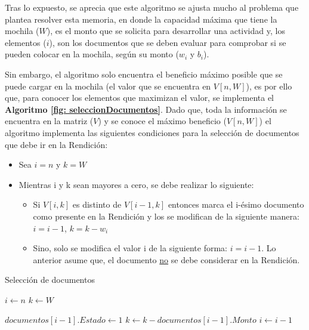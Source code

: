 Tras lo expuesto, se aprecia que este algoritmo se ajusta mucho al problema que plantea resolver esta memoria, en donde la capacidad máxima que tiene la mochila ($W$), es el monto que se solicita para desarrollar una actividad y, los elementos ($i$), son los documentos que se deben evaluar para comprobar si se pueden colocar en la mochila, según su monto ($w_i$ y $b_i$).

Sin embargo, el algoritmo solo encuentra el beneficio máximo posible que se puede cargar en la mochila (el valor que se encuentra en $V[n,W]$), es por ello que, para conocer los elementos  que maximizan el valor, se implementa el \textbf{Algoritmo \ref{fig: seleccionDocumentos}}. Dado que, toda la información se encuentra en la matriz ($V$) y se conoce el máximo beneficio ($V[n,W]$) el algoritmo implementa las siguientes condiciones para la selección de documentos que debe ir en la Rendición:


\begin{itemize}
    \item Sea $i=n$ y $k=W$
    \item Mientras i y k sean mayores a cero, se debe realizar lo siguiente:
    \begin{itemize}
        \item Si $V[i,k]$ es distinto de $V[i-1,k]$ entonces marca el i-ésimo documento como presente en la Rendición y los se modifican de la siguiente manera: $i=i-1$, $k=k-w_i$
        \item Sino, solo se modifica el valor i de la siguiente forma: $i=i-1$. Lo anterior asume que, el documento \underline{no} se debe considerar en la Rendición.
    \end{itemize}
    
\end{itemize}


\begin{algorithm}
    \caption{\label{fig: seleccionDocumentos}Selección de documentos}
    \begin{algorithmic}[1]


    \vspace{3mm}
    \State $i \gets n$
    \State $k \gets W$

    \vspace{3mm}
            \State $documentos[i - 1].Estado \gets 1$
            \State $k \gets k - documentos[i - 1].Monto$
        \EndIf
        \State $i \gets i - 1$
    \EndWhile
  \end{algorithmic}
\end{algorithm}